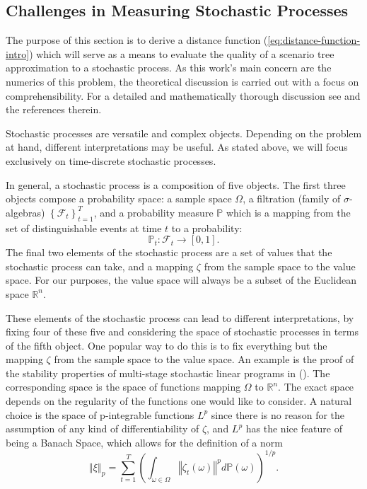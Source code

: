 \subsection{Challenges in Measuring Stochastic Processes}
\label{sec:measuring-challenges}
The purpose of this section is to derive a distance function (\ref{eq:distance-function-intro}) which will serve as a means to evaluate the quality of a scenario tree approximation to a stochastic process.
As this work's main concern are the numerics of this problem, the theoretical discussion is carried out with a focus on comprehensibility.
For a detailed and mathematically thorough discussion see  and the references therein.

Stochastic processes are versatile and complex objects.
Depending on the problem at hand, different interpretations may be useful.
As stated above, we will focus exclusively on time-discrete stochastic processes.

In general, a stochastic process is a composition of five objects. The first three objects compose a probability space: a sample space $\Omega$, a filtration (family of $\sigma$-algebras) $\left\{\mathcal{F}_t\right\}_{t=1}^T$, and a probability measure $\mathbb{P}$ which is a mapping from the set of distinguishable events at time $t$ to a probability:
\begin{equation}
  \label{eq:prob-measure-definition}
  \mathbb{P}_t : \mathcal{F}_t \rightarrow \left[0,1\right]. 
\end{equation}
The final two elements of the stochastic process are a set of values that the stochastic process can take, and a mapping $\zeta$ from the sample space to the value space. For our purposes, the value space will always be a subset of the Euclidean space $\mathbb{R}^n$.

These elements of the stochastic process can lead to different interpretations, by fixing four of these five and considering the space of stochastic processes in terms of the fifth object. One popular way to do this is to fix everything but the mapping $\zeta$ from the sample space to the value space. An example is the proof of the stability properties of multi-stage stochastic linear programs in (\cite{Heitsch2010}). The corresponding space is the space of functions mapping $\Omega$ to $\mathbb{R}^n$. The exact space depends on the regularity of the functions one would like to consider. A natural choice is the space of p-integrable functions $L^p$ since there is no reason for the assumption of any kind of differentiability of $\zeta$, and $L^p$ has the nice feature of being a Banach Space, which allows for the definition of a norm
\begin{equation}
  \label{eq:Lp-norm}
  \left\Vert\xi\right\Vert_p = \sum_{t=1}^T\left(\int_{\omega\in \Omega}\left\Vert\zeta_t(\omega)\right\Vert^p d\mathbb{P}(\omega)\right)^{1/p}.
\end{equation}

